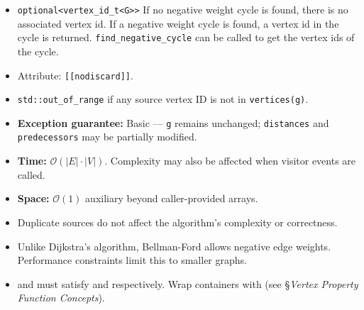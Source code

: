 \begin{itemdescr}
      \pnum\returns 
            \begin{itemize}
                  \item \lstinline{optional<vertex_id_t<G>>} If no negative weight cycle is found, 
                        there is no associated vertex id. If a negative weight cycle is found, a
                        vertex id in the cycle is returned. \lstinline{find_negative_cycle}
                        can be called to get the vertex ids of the cycle.
                  \item Attribute: \lstinline{[[nodiscard]]}.
            \end{itemize}
      \pnum\throws
            \begin{itemize}
                  \item \lstinline{std::out_of_range} if any source vertex ID is not in \lstinline{vertices(g)}.
                  \item \textbf{Exception guarantee:} Basic --- \lstinline{g} remains unchanged;
                        \lstinline{distances} and \lstinline{predecessors} may be partially modified.
            \end{itemize}
      \pnum\complexity
            \begin{itemize}
                  \item \textbf{Time:} $\mathcal{O}(|E| \cdot |V|)$. Complexity may also be affected when visitor events are called.
                  \item \textbf{Space:} $\mathcal{O}(1)$ auxiliary beyond caller-provided arrays.
            \end{itemize}
      \pnum\remarks 
            \begin{itemize}
                  \item Duplicate sources do not affect the algorithm's complexity or correctness.
                  \item Unlike Dijkstra's algorithm, Bellman-Ford allows negative edge weights.
                        Performance constraints limit this to smaller graphs.
                  \item {} and  must satisfy 
                        and  respectively.  Wrap containers with
                         (see §\textit{Vertex Property Function Concepts}).
            \end{itemize}
\end{itemdescr}

